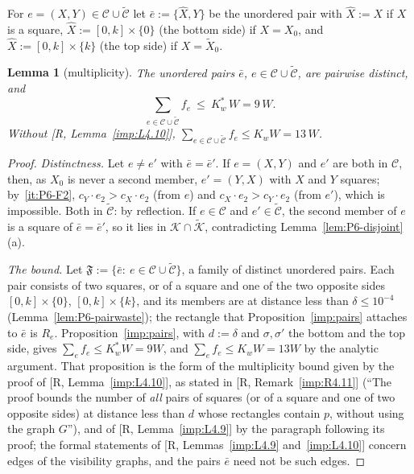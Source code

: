 \documentclass[11pt]{amsart}
\newtheorem{lemma}[theorem]{Lemma}
\theoremstyle{definition}
\theoremstyle{remark}
\numberwithin{equation}{section}
\begin{document}
For $e=(X,Y)\in\mathcal C\cup\tilde{\mathcal C}$ let $\bar e:=\{\hat X,Y\}$ be the unordered pair with $\hat X:=X$ if
$X$ is a square, $\hat X:=[0,k]\times\{0\}$ (the bottom side) if $X=X_0$, and $\hat X:=[0,k]\times\{k\}$ (the top side)
if $X=\tilde X_0$.

\begin{lemma}[multiplicity]\label{lem:P6-overlap}
The unordered pairs $\bar e$, $e\in\mathcal C\cup\tilde{\mathcal C}$, are pairwise distinct, and
\begin{equation}\label{eq:P6-overlap}
\sum_{e\in\mathcal C\cup\tilde{\mathcal C}}f_e\ \le\ K_w^*\,W=9\,W .
\end{equation}
Without [R, Lemma~\ref{imp:L4.10}], $\sum_{e\in\mathcal C\cup\tilde{\mathcal C}}f_e\le K_wW=13\,W$.
\end{lemma}

\begin{proof}
\emph{Distinctness.} Let $e\neq e'$ with $\bar e=\bar e'$. If $e=(X,Y)$ and $e'$ are both in $\mathcal C$, then, as
$X_0$ is never a second member, $e'=(Y,X)$ with $X$ and $Y$ squares; by~\ref{it:P6-F2}, $c_Y\cdot e_2>c_X\cdot e_2$
(from $e$) and $c_X\cdot e_2>c_Y\cdot e_2$ (from $e'$), which is impossible. Both in $\tilde{\mathcal C}$: by
reflection. If $e\in\mathcal C$ and $e'\in\tilde{\mathcal C}$, the second member of $e$ is a square of
$\bar e=\bar e'$, so it lies in $\mathcal K\cap\tilde{\mathcal K}$, contradicting Lemma~\ref{lem:P6-disjoint}(a).

\emph{The bound.} Let $\mathfrak F:=\{\bar e:\ e\in\mathcal C\cup\tilde{\mathcal C}\}$, a family of distinct unordered
pairs. Each pair consists of two squares, or of a square and one of the two opposite sides $[0,k]\times\{0\}$,
$[0,k]\times\{k\}$, and its members are at distance less than $\delta\le10^{-4}$ (Lemma~\ref{lem:P6-pairwaste});
the rectangle that Proposition~\ref{imp:pairs} attaches to $\bar e$ is $R_e$. Proposition~\ref{imp:pairs}, with
$d:=\delta$ and $\sigma,\sigma'$ the bottom and the top side, gives $\sum_{e}f_e\le K_w^*W=9W$, and
$\sum_ef_e\le K_wW=13W$ by the analytic argument. That proposition is the form of the multiplicity bound given by
the proof of [R, Lemma~\ref{imp:L4.10}], as stated in [R, Remark~\ref{imp:R4.11}] (``The proof bounds the number of
\emph{all} pairs of squares (or of a square and one of two opposite sides) at distance less than $d$ whose rectangles
contain $p$, without using the graph $G$''), and of [R, Lemma~\ref{imp:L4.9}] by the paragraph following its proof;
the formal statements of [R, Lemmas~\ref{imp:L4.9} and~\ref{imp:L4.10}] concern edges of the visibility graphs, and
the pairs $\bar e$ need not be such edges.
\end{proof}
\end{document}
